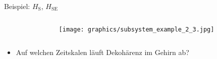 \begin{frame}{Beispiel: $H_{\mathrm{S}}$, $H_{\mathrm{SE}}$}
{\begin{columns}
\begin{column}{0.55\textwidth}
\begin{beamerboxesrounded}{}
\begin{equation*}
					\end{equation*}
					\vspace{-0.5cm}
				\end{beamerboxesrounded}
			\end{column}
			\begin{column}{0.35\textwidth}
				\centering
				\texttt{[image: graphics/subsystem\_example\_2\_3.jpg]}
			\end{column}
		\end{columns}
	\begin{itemize}
		\item{Auf welchen Zeitskalen läuft Dekohärenz im Gehirn ab?}
	\end{itemize}}{}			
		
\end{frame}